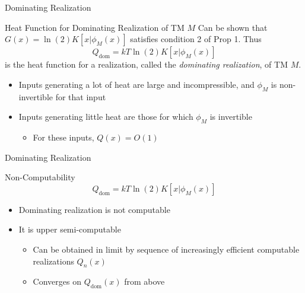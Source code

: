 \begin{frame}{Dominating Realization}
\begin{block}{Heat Function for Dominating Realization of TM $M$}
Can be shown that $G(x) = \ln(2)K[x|\phi_M(x)]$ satisfies condition 2 of Prop 1. Thus
\begin{equation*}
    Q_\text{dom} = kT\ln(2)K[x|\phi_M(x)]
\end{equation*}
is the heat function for a realization, called the \textit{dominating realization}, of TM $M$.
\begin{itemize}
    \item Inputs generating a lot of heat are large and incompressible, and $\phi_M$ is non-invertible for that input
    \item Inputs generating little heat are those for which $\phi_M$ is invertible
    \begin{itemize}
        \item For these inputs, $Q(x) = O(1)$
    \end{itemize}
\end{itemize}
\end{block}
\end{frame}

\begin{frame}{Dominating Realization}
\begin{block}{Non-Computability}
\begin{equation*}
    Q_\text{dom} = kT\ln (2)K[x|\phi_M(x)]
\end{equation*}
    \begin{itemize}
        \item Dominating realization is not computable
        \item It is upper semi-computable
        \begin{itemize}
            \item Can be obtained in limit by sequence of increasingly efficient computable realizations $Q_n(x)$
            \item Converges on $Q_\text{dom}(x)$ from above
        \end{itemize}
    \end{itemize}
    \end{block}
\end{frame}


